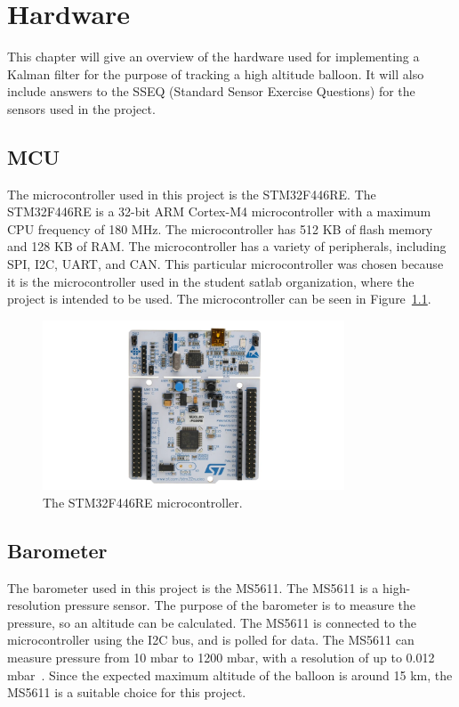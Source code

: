 \chapter{Hardware}\label{ch:hardware}
This chapter will give an overview of the hardware used for implementing a Kalman filter for the purpose of tracking a high altitude balloon.
It will also include answers to the SSEQ (Standard Sensor Exercise Questions) for the sensors used in the project.


\section{MCU}\label{sec:mcu}
The microcontroller used in this project is the STM32F446RE. The STM32F446RE is a 32-bit ARM Cortex-M4 microcontroller with a maximum CPU frequency of 180 MHz.
The microcontroller has 512 KB of flash memory and 128 KB of RAM.
The microcontroller has a variety of peripherals, including SPI, I2C, UART, and CAN.
This particular microcontroller was chosen because it is the microcontroller used in the student satlab organization, where the project is intended to be used.
The microcontroller can be seen in Figure~\ref{fig:stm32f446re}.
\begin{figure}[H]
    \centering
    \includegraphics[width=0.8\textwidth]{chapters/02Harware/figures/stm32}
    \caption{The STM32F446RE microcontroller.}
    \label{fig:stm32f446re}
\end{figure}


\section{Barometer}\label{sec:barometer}
The barometer used in this project is the MS5611.
The MS5611 is a high-resolution pressure sensor.
The purpose of the barometer is to measure the pressure, so an altitude can be calculated.
The MS5611 is connected to the microcontroller using the I2C bus, and is polled for data.
The MS5611 can measure pressure from 10 mbar to 1200 mbar, with a resolution of up to 0.012 mbar~\cite{ms5611}.
Since the expected maximum altitude of the balloon is around 15 km, the MS5611 is a suitable choice for this project.

